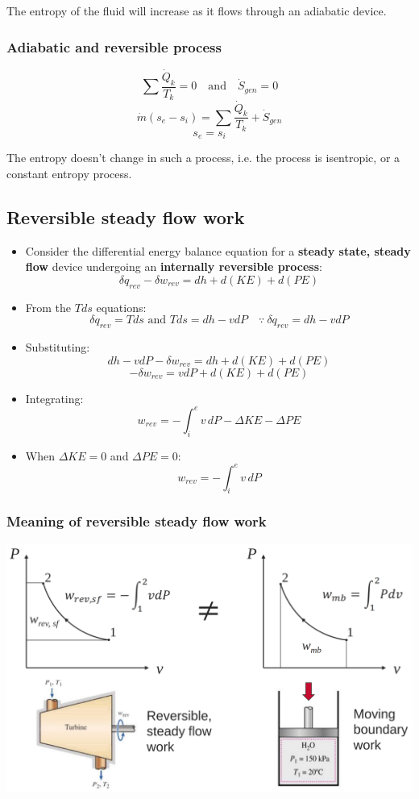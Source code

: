 \documentclass[11pt]{article}
\begin{document}
The entropy of the fluid will increase as it flows through an adiabatic device.

\subsubsection{Adiabatic and reversible process}
\label{sec:org46c1733}
\[\sum \frac{\dot{Q}_k}{T_k} = 0 \quad \text{and} \quad \dot{S}_{gen} = 0\]
\[\dot{m} (s_e - s_i) = \sum \frac{\dot{Q}_k}{T_k} + \dot{S}_{gen}\]
\[s_e = s_i\]

The entropy doesn't change in such a process, i.e. the process is isentropic, or a constant entropy process.

 \newpage

\subsection{Reversible steady flow work}
\label{sec:org6194da4}
\begin{itemize}
\item Consider the differential energy balance equation for a \textbf{steady state, steady flow} device undergoing an \textbf{internally reversible process}:
\[\delta q_{rev} - \delta w_{rev} = dh + d(KE) + d(PE)\]
\item From the \(Tds\) equations:
\[\delta q_{rev} = T ds \text{ and } Tds = dh - v dP \quad \because \ \delta q_{rev} = dh - vdP\]
\item Substituting:
\[dh - vdP - \delta w_{rev} = dh + d(KE) + d(PE)\]
\[- \delta w_{rev} = v dP + d(KE) + d(PE)\]
\item Integrating:
\[w_{rev} = - \int_i^e v \, dP - \Delta KE - \Delta PE\]
\item When \(\Delta KE = 0\) and \(\Delta PE = 0\):
\[w_{rev} = - \int_i^e v \, dP\]
\end{itemize}

\subsubsection{Meaning of reversible steady flow work}
\label{sec:org4b8a8b4}
\begin{center}
\includegraphics[width=.9\linewidth]{./images/reversible-steady-flow-work.png}
\end{center}
\end{document}
